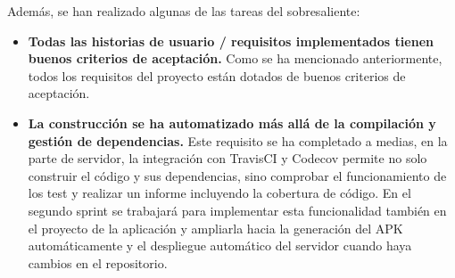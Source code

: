 \documentclass[11pt,a4paper]{report}
\begin{document}
Además, se han realizado algunas de las tareas del sobresaliente:
\begin{itemize}
	\item \textbf{Todas las historias de usuario / requisitos implementados tienen buenos criterios de aceptación.} Como se ha mencionado anteriormente, todos los requisitos del proyecto están dotados de buenos criterios de aceptación.
	\item \textbf{La construcción se ha automatizado más allá de la compilación y gestión de dependencias.} Este requisito se ha completado a medias, en la parte de servidor, la integración con TravisCI y Codecov permite no solo construir el código y sus dependencias, sino comprobar el funcionamiento de los test y realizar un informe incluyendo la cobertura de código. En el segundo sprint se trabajará para implementar esta funcionalidad también en el proyecto de la aplicación y ampliarla hacia la generación del APK automáticamente y el despliegue automático del servidor cuando haya cambios en el repositorio.
\end{itemize}
\end{document}
